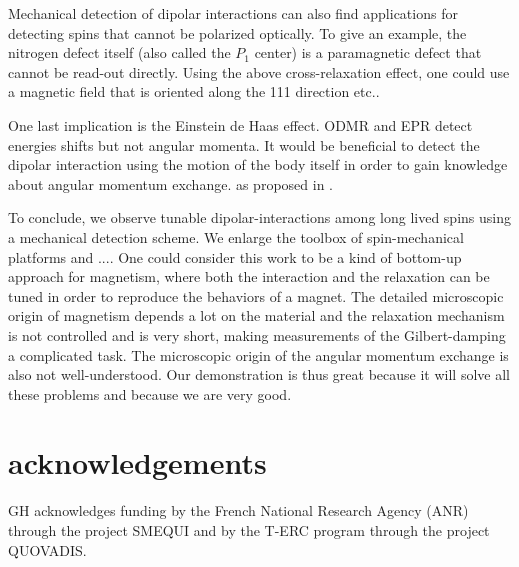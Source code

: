 \documentclass[preprintnumbers,amsmath,amssymb,superscriptaddress,twocolumn,showpacs]{revtex4-1}
\begin{document}
Mechanical detection of dipolar interactions can also find applications for detecting spins that cannot be polarized optically. 
To give an example, the nitrogen defect itself (also called the $P_1$ center) is a paramagnetic defect that cannot be read-out directly. 
Using the above cross-relaxation effect, one could use a magnetic field that is oriented along the 111 direction etc..

One last implication is the Einstein de Haas effect.
ODMR and EPR detect energies shifts but not angular momenta. 
It would be beneficial to detect the dipolar interaction using the motion of the body itself in order to gain knowledge about angular momentum exchange.
as proposed in \cite{Zangara}.

To conclude, we observe tunable dipolar-interactions among long lived spins using a mechanical detection scheme.
We enlarge the toolbox of spin-mechanical platforms and ....
One could consider this work to be a kind of bottom-up approach for magnetism, where both the interaction and the relaxation can be tuned in order to reproduce the behaviors of a magnet. 
The detailed microscopic origin of magnetism depends a lot on the material and the relaxation mechanism is not controlled and is very short, making measurements of the  Gilbert-damping a complicated task.
The microscopic origin of the angular momentum exchange is also not well-understood. 
Our demonstration is thus great because it will solve all these problems and because we are very good.

\section*{acknowledgements}
GH acknowledges funding by the French National Research Agency (ANR) through the project SMEQUI and by the T-ERC program through the project QUOVADIS. 


\end{document}
